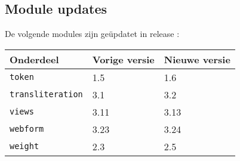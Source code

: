 


\subsection{Module updates} %
\label{sub:module_updates}

De volgende modules zijn ge\"updatet in release \release:

\begin{tabularx}{\linewidth}{X|l|l} \hline
  \textbf{Onderdeel} & \textbf{Vorige versie} & \textbf{Nieuwe versie} \\ \hline
  \texttt{token} & 1.5 & 1.6 \\ \hline
  \texttt{transliteration} & 3.1 & 3.2 \\ \hline
  \texttt{views} & 3.11 & 3.13 \\ \hline
  \texttt{webform} & 3.23 & 3.24 \\ \hline
  \texttt{weight} & 2.3 & 2.5 \\ \hline
\end{tabularx}





